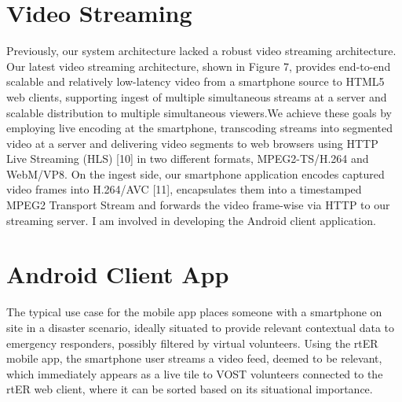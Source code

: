 \section{Video Streaming}
Previously, our system architecture lacked a robust video streaming architecture.
Our latest video streaming architecture, shown in Figure 7, provides end-to-end scalable and relatively low-latency video from a smartphone source to HTML5 web clients, supporting ingest of multiple simultaneous streams at a server and scalable distribution to multiple simultaneous viewers.We achieve these goals by employing live encoding at the smartphone, transcoding streams into segmented video at a server and delivering video segments to web browsers using HTTP Live Streaming (HLS) [10] in two different formats, MPEG2-TS/H.264 and WebM/VP8. On the ingest side, our smartphone application encodes captured video frames into H.264/AVC [11], encapsulates them into a timestamped MPEG2 Transport Stream and forwards the video frame-wise via HTTP to our streaming server. I am involved in developing the Android client application.

\section{Android Client App}
The typical use case for the mobile app places someone with a smartphone on site in a disaster scenario, ideally situated to provide relevant contextual data to emergency responders, possibly filtered by virtual volunteers. Using the rtER mobile app, the smartphone user streams a video feed, deemed to be relevant, which immediately appears as a live tile to VOST volunteers connected to the rtER web client, where it can be sorted based on its situational importance.

